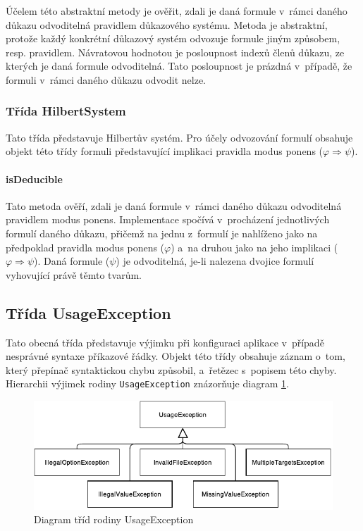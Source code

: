 \documentclass[thesis=B,czech,hidelinks]{thesis}[2012/06/26]
\begin{document}
Účelem této abstraktní metody je ověřit, zdali je daná formule v~rámci daného důkazu odvoditelná pravidlem důkazového systému. Metoda je abstraktní, protože každý konkrétní důkazový systém odvozuje formule jiným způsobem, resp. pravidlem. Návratovou hodnotou je posloupnost indexů členů důkazu, ze kterých je daná formule odvoditelná. Tato posloupnost je prázdná v~případě, že formuli v~rámci daného důkazu odvodit nelze.

\subsubsection{Třída HilbertSystem}

Tato třída představuje Hilbertův systém. Pro účely odvozování formulí obsahuje objekt této třídy formuli představující implikaci pravidla modus ponens ($\varphi \Rightarrow \psi$).

\paragraph{isDeducible}

Tato metoda ověří, zdali je daná formule v~rámci daného důkazu odvoditelná pravidlem modus ponens. Implementace spočívá v~procházení jednotlivých formulí daného důkazu, přičemž na jednu z~formulí je nahlíženo jako na předpoklad pravidla modus ponens ($\varphi$) a~na druhou jako na jeho implikaci ($\varphi \Rightarrow \psi$). Daná formule ($\psi$) je odvoditelná, je-li nalezena dvojice formulí vyhovující právě těmto tvarům.

\begin{algorithm}
{
	{
			{
				\;
			}
	}
}
\end{algorithm}

\subsection{Třída UsageException}

Tato obecná třída představuje výjimku při konfiguraci aplikace v~případě nesprávné syntaxe příkazové řádky. Objekt této třídy obsahuje záznam o~tom, který přepínač syntaktickou chybu způsobil, a~řetězec s~popisem této chyby. Hierarchii výjimek rodiny \texttt{UsageException} znázorňuje diagram \ref{fig:usage_exception}.

\begin{figure}
\centering
\caption{Diagram tříd rodiny UsageException}
\label{fig:usage_exception}
\includegraphics{diagrams/usage_exception}
\end{figure}
\end{document}
